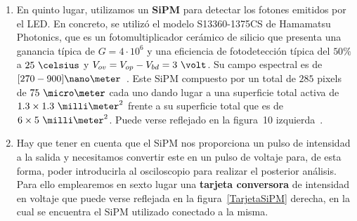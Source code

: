 \begin{enumerate}
\item {} En quinto lugar, utilizamos un \textbf{SiPM} para detectar los fotones emitidos por el LED. En concreto, se utilizó el modelo S13360-1375CS de Hamamatsu Photonics, que es un fotomultiplicador cerámico de silicio que presenta una ganancia típica de $G=4 \cdotp 10^6$ y una eficiencia de fotodetección típica del $50\%$ a $25~\celsius$ y $V_{ov}=V_{op}-V_{bd}=3~\volt$. Su campo espectral  es de $[270-900]\nano\meter$~\cite{datasheet SiPM}.
Este SiPM compuesto por un total de $285$ pixels de $75~\micro\meter$ cada uno dando lugar a una superficie total activa de $1.3\times1.3~\milli\meter^2$ frente a su superficie total que es de $6\times5~\milli\meter^2$. Puede verse reflejado en la figura~10 izquierda~\cite{datasheet SiPM}. 

\item {} Hay que tener en cuenta que el SiPM nos proporciona un pulso de intensidad a la salida y  necesitamos convertir este en un pulso de voltaje para, de esta forma, poder introducirla al osciloscopio para realizar el posterior análisis. Para ello emplearemos en sexto lugar una \textbf{tarjeta conversora} de intensidad en voltaje que puede verse reflejada en la figura~\ref{TarjetaSiPM} derecha, en la cual se encuentra el SiPM utilizado conectado a la misma. 


\end{enumerate}
